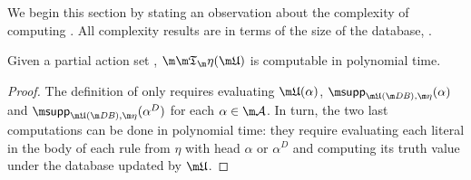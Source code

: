 We begin this section by stating an observation about the complexity of computing \Ap.
All complexity results are in terms of the size of the database, \fulldb.
\begin{proposition}
  \label{prop:At-poly}
  Given a partial action set \UUU, 
  $\Ap(\UUU)$ is computable in polynomial time. %
\end{proposition}
\begin{proof}
    The definition of \Ap only requires evaluating $\UUU(\alpha)$, $\supp_{\UUU(\db),\aics}(\alpha)$ and $\supp_{\UUU(\db),\aics}(\alpha^D)$ for each $ \alpha\in\acts$.
    In turn, the two last computations can be done in polynomial time: they require evaluating each literal in the body of each rule from $\eta$ with head $\alpha$ or $\alpha^D$ and computing its truth value under the database updated by $\UUU$.
\end{proof}


